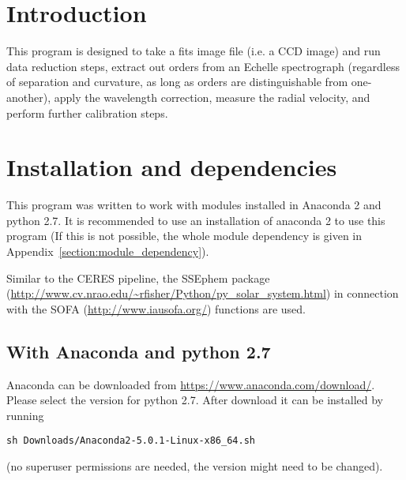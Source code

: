 \documentclass[10pt,a4paper]{article}
\begin{document}
\newpage

\section{Introduction}
\label{intro}




This program is designed to take a fits image file (i.e. a CCD image) and run data reduction steps, extract out orders from an Echelle spectrograph (regardless of separation and curvature, as long as orders are distinguishable from one-another), apply the wavelength correction, measure the radial velocity, and perform further calibration steps. 



\newpage
\section{Installation and dependencies}
\label{installation}

\noindent This program was written to work with modules installed in Anaconda 2 and python 2.7. It is recommended to use an installation of anaconda 2 to use this program (If this is not possible, the whole module dependency is given in Appendix~\ref{section:module_dependency}).

Similar to the CERES pipeline, the SSEphem package (\url{http://www.cv.nrao.edu/~rfisher/Python/py_solar_system.html}) in connection with the SOFA (\url{http://www.iausofa.org/}) functions are used. 


\subsection{With Anaconda and python 2.7}

\noindent Anaconda can be downloaded from \url{https://www.anaconda.com/download/}. Please select the version for python 2.7. After download it can be installed by running
\begin{lstlisting}[style=base]
sh Downloads/Anaconda2-5.0.1-Linux-x86_64.sh
\end{lstlisting}
(no superuser permissions are needed, the version might need to be changed).
\end{document}
